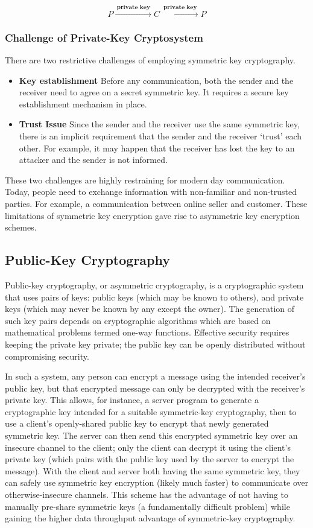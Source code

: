 \documentclass[british]{article}
\begin{document}
\[
P\xrightarrow{\:\textbf{private key}\:}C\xrightarrow{\:\textbf{private key}\:}P
\]

\medskip{}


\subsubsection{Challenge of Private-Key Cryptosystem}

There are two restrictive challenges of employing symmetric key cryptography.
\begin{itemize}
\item \textbf{Key establishment \textminus{}} Before any communication,
both the sender and the receiver need to agree on a secret symmetric
key. It requires a secure key establishment mechanism in place.
\item \textbf{Trust Issue \textminus{}} Since the sender and the receiver
use the same symmetric key, there is an implicit requirement that
the sender and the receiver `trust' each other. For example, it
may happen that the receiver has lost the key to an attacker and the
sender is not informed.
\end{itemize}
These two challenges are highly restraining for modern day communication.
Today, people need to exchange information with non-familiar and non-trusted
parties. For example, a communication between online seller and customer.
These limitations of symmetric key encryption gave rise to asymmetric
key encryption schemes.

\subsection{Public-Key Cryptography}

Public-key cryptography, or asymmetric cryptography, is a cryptographic
system that uses pairs of keys: public keys (which may be known to
others), and private keys (which may never be known by any except
the owner). The generation of such key pairs depends on cryptographic
algorithms which are based on mathematical problems termed one-way
functions. Effective security requires keeping the private key private;
the public key can be openly distributed without compromising security.

In such a system, any person can encrypt a message using the intended
receiver's public key, but that encrypted message can only be decrypted
with the receiver's private key. This allows, for instance, a server
program to generate a cryptographic key intended for a suitable symmetric-key
cryptography, then to use a client's openly-shared public key to encrypt
that newly generated symmetric key. The server can then send this
encrypted symmetric key over an insecure channel to the client; only
the client can decrypt it using the client's private key (which pairs
with the public key used by the server to encrypt the message). With
the client and server both having the same symmetric key, they can
safely use symmetric key encryption (likely much faster) to communicate
over otherwise-insecure channels. This scheme has the advantage of
not having to manually pre-share symmetric keys (a fundamentally difficult
problem) while gaining the higher data throughput advantage of symmetric-key
cryptography.
\end{document}
